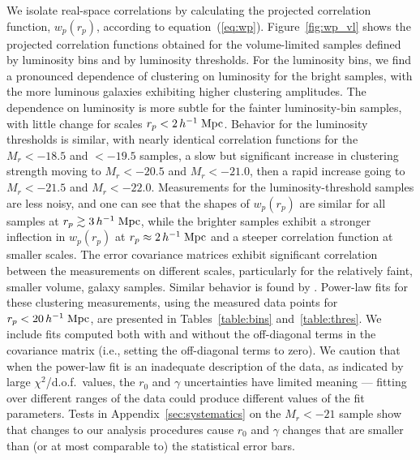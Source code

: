 \documentclass[]{emulateapj}
\newcommand{\hmpc}{\,h^{-1}\;{\rm Mpc}}
\newcommand{\wrp}{{w_p(r_p)}}
\begin{document}
We isolate real-space
correlations by calculating the projected correlation function, $w_p(r_p)$,
according to equation~(\ref{eq:wp}).  
Figure~\ref{fig:wp_vl} shows the projected correlation
functions obtained for the volume-limited samples defined
by luminosity bins and by luminosity thresholds.
%
For the luminosity bins,
we find a pronounced dependence of clustering on luminosity for the
bright samples, with the more luminous galaxies exhibiting
higher clustering amplitudes.  The dependence on luminosity is more
subtle for the fainter luminosity-bin 
samples, with little change for scales $r_p<2 \hmpc$.  
Behavior for the luminosity thresholds is similar, with 
nearly identical correlation functions for the $M_r<-18.5$ and $<-19.5$
samples, a slow but significant increase in clustering strength
moving to $M_r<-20.5$ and $M_r<-21.0$, then a rapid increase going to
$M_r<-21.5$ and $M_r<-22.0$.  Measurements for the luminosity-threshold
samples are less noisy, and one can see that the shapes
of $\wrp$ are similar for all samples at $r_p \ga 3\hmpc$,
while the brighter samples exhibit a stronger inflection in
$\wrp$ at $r_p \approx 2\hmpc$ and a steeper correlation function
at smaller scales.
The error covariance matrices exhibit significant correlation between
the measurements on different scales, particularly for the relatively
faint, smaller volume, galaxy samples.  Similar behavior is found by
\citet{mcbride10}.
Power-law fits for these clustering measurements, using the measured
data points for $r_p < 20 \hmpc$, 
are presented in Tables~\ref{table:bins} and~\ref{table:thres}.
We include fits computed both with and without the off-diagonal
terms in the covariance matrix (i.e., setting the off-diagonal terms
to zero).
We caution that when the power-law fit is an inadequate
description of the data, as indicated by large $\chi^2$/d.o.f.\ values,
the $r_0$ and $\gamma$ uncertainties have limited meaning ---
fitting over different ranges of the data could produce different
values of the fit parameters.
Tests in Appendix~\ref{sec:systematics} on the $M_r<-21$ sample
show that changes to our analysis procedures cause $r_0$ and $\gamma$
changes that are smaller than (or at most comparable to) 
the statistical error bars.

\begin{figure*}[tbp]
\caption[]{\label{fig:wp_vl}
Projected correlation functions for volume-limited samples corresponding
to different luminosity-bin samples (left) and luminosity-threshold
samples (right), as labeled. Error covariance matrices are computed from
jackknife resampling as described in the text. The error bars shown are
the square root of the diagonal elements of these matrices.
For visual clarity, only a subset of the threshold samples are plotted.
}
\end{figure*}
\end{document}
